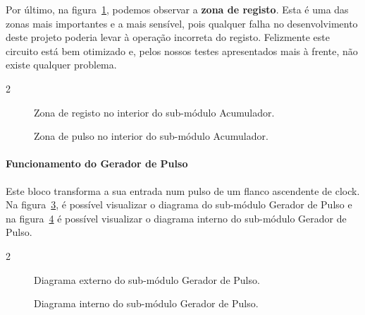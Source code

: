 Por último, na figura~\ref{fig:Acumulador_reg}, podemos observar a \textbf{zona de registo}. Esta é uma das zonas mais importantes e a mais sensível, pois qualquer falha no desenvolvimento deste projeto poderia levar à operação incorreta do registo. Felizmente este circuito está bem otimizado e, pelos nossos testes apresentados mais à frente, não existe qualquer problema.

\begin{multicols}{2}
    \noindent
    \begin{minipage}[b]{0.5\textwidth}
        \begin{figure}[H]
            \centering
            
            \caption{Zona de registo no interior do sub-módulo Acumulador.}\label{fig:Acumulador_reg}
        \end{figure}
    \end{minipage}\begin{minipage}[b]{0.5\textwidth}
        \begin{figure}[H]
            \centering
            
            \caption{Zona de pulso no interior do sub-módulo Acumulador.}\label{fig:Acumulador_pulse}
        \end{figure}
    \end{minipage}
\end{multicols}

\paragraph{Funcionamento do Gerador de Pulso}

Este bloco transforma a sua entrada num pulso de um flanco ascendente de \gls{clock}. Na figura~\ref{fig:PulseGenerator}, é possível visualizar o diagrama do sub-módulo Gerador de Pulso e na figura~\ref{fig:PulseGenerator_inside} é possível visualizar o diagrama interno do sub-módulo Gerador de Pulso.

\begin{multicols}{2}
    \noindent
    \begin{minipage}[b]{0.5\textwidth}
        \begin{figure}[H]
            \centering
            
            \caption{Diagrama externo do sub-módulo Gerador de Pulso.}\label{fig:PulseGenerator}
        \end{figure}
    \end{minipage}\begin{minipage}[b]{0.5\textwidth}
        \begin{figure}[H]
            \centering
            
            \caption{Diagrama interno do sub-módulo Gerador de Pulso.}\label{fig:PulseGenerator_inside}
        \end{figure}
    \end{minipage}
\end{multicols}

